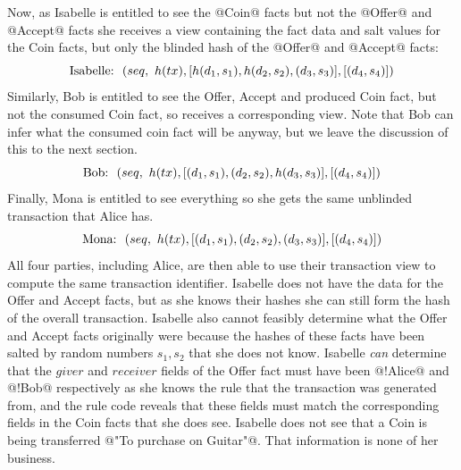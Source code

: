 Now, as Isabelle is entitled to see the @Coin@ facts but not the @Offer@ and @Accept@ facts she receives a view containing the fact data and salt values for the Coin facts, but only the blinded hash of the @Offer@ and @Accept@ facts:
$$
\textrm{Isabelle:}~~(seq,~ h(tx), [h(d_1, s_1), h(d_2, s_2), (d_3, s_3)], [(d_4, s_4)])
$$
Similarly, Bob is entitled to see the Offer, Accept and produced Coin fact, but not the consumed Coin fact, so receives a corresponding view. Note that Bob can infer what the consumed coin fact will be anyway, but we leave the discussion of this to the next section.
$$
\textrm{Bob:}~~(seq,~ h(tx), [(d_1, s_1), (d_2, s_2), h(d_3, s_3)], [(d_4, s_4)])
$$
Finally, Mona is entitled to see everything so she gets the same unblinded transaction that Alice has.
$$
\textrm{Mona:}~~(seq,~ h(tx), [(d_1, s_1), (d_2, s_2), (d_3, s_3)], [(d_4, s_4)])
$$
All four parties, including Alice, are then able to use their transaction view to compute the same transaction identifier. Isabelle does not have the data for the Offer and Accept facts, but as she knows their hashes she can still form the hash of the overall transaction. Isabelle also cannot feasibly determine what the Offer and Accept facts originally were because the hashes of these facts have been salted by random numbers $s_1, s_2$ that she does not know. Isabelle \emph{can} determine that the $giver$ and $receiver$ fields of the Offer fact must have been @!Alice@ and @!Bob@ respectively as she knows the rule that the transaction was generated from, and the rule code reveals that these fields must match the corresponding fields in the Coin facts that she does see. Isabelle does not see that a Coin is being transferred @"To purchase on Guitar"@. That information is none of her business.






